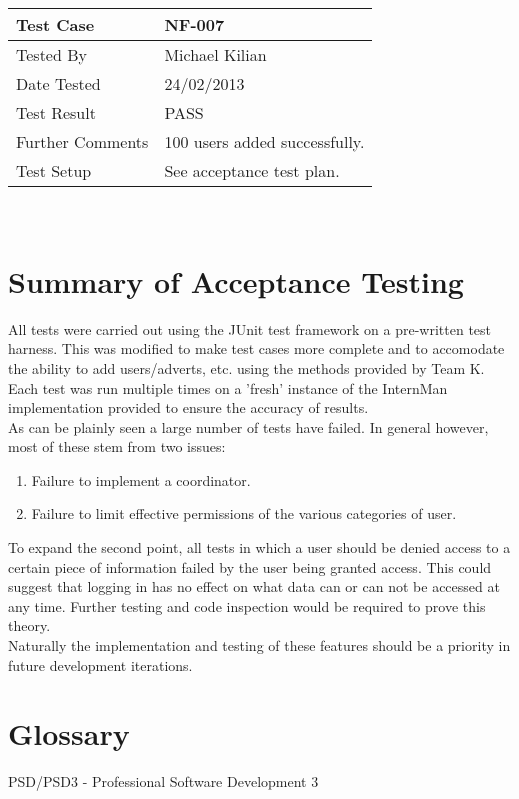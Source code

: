\documentclass{l3deliverable}
\begin{document}
\begin{tabular}{lp{10cm}}
\hline 
\textbf{Test Case} & NF-007\tabularnewline
\hline 
\hline 
Tested By & Michael Kilian\tabularnewline
\hline 
Date Tested & 24/02/2013\tabularnewline
\hline 
Test Result & PASS\tabularnewline
\hline
Further Comments & 100 users added successfully.\tabularnewline
\hline
Test Setup & See acceptance test plan.\tabularnewline
\hline
\end{tabular}\\
\section{Summary of Acceptance Testing}
All tests were carried out using the JUnit test framework on a pre-written test harness. This was modified to make test cases more complete and to accomodate the ability to add users/adverts, etc. using the methods provided by Team K. Each test was run multiple times on a 'fresh' instance of the InternMan implementation provided to ensure the accuracy of results.\\

As can be plainly seen a large number of tests have failed. In general however, most of these stem from two issues:
\begin{enumerate}
\item{Failure to implement a coordinator.}
\item{Failure to limit effective permissions of the various categories of user.}
\end{enumerate}
To expand the second point, all tests in which a user should be denied access to a certain piece of information failed by the user being granted access. This could suggest that logging in has no effect on what data can or can not be accessed at any time. Further testing and code inspection would be required to prove this theory.\\
Naturally the implementation and testing of these features should be a priority in future development iterations.\\

\appendix

\section{Glossary}
PSD/PSD3 - Professional Software Development 3
\end{document}
